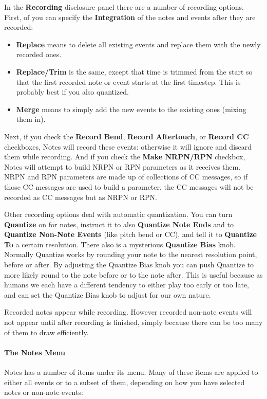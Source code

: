 \documentclass[twoside,10pt]{article}
\begin{document}
In the {\bf Recording} disclosure panel there are a number of recording options.   First, of you can specify the {\bf Integration} of the notes and events after they are recorded:

\begin{itemize}
\item {\bf Replace} means to delete all existing events and replace them with the newly recorded ones.
\item {\bf Replace/Trim} is the same, except that time is trimmed from the start so that the first recorded note or event starts at the first timestep.  This is probably best if you also quantized.
\item {\bf Merge} means to simply add the new events to the existing ones (mixing them in).
\end{itemize}

Next, if you check the {\bf Record Bend}, {\bf Record Aftertouch}, or {\bf Record CC} checkboxes, Notes will record these events: otherwise it will ignore and discard them while recording.   And if you check the {\bf Make NRPN/RPN} checkbox, Notes will attempt to build NRPN or RPN parameters as it receives them.  NRPN and RPN parameters are made up of collections of CC messages, so if those CC messages are used to build a parameter, the CC messages will not be recorded as CC messages but as NRPN or RPN.  

Other recording options deal with automatic quantization.  You can turn {\bf Quantize} on for notes, instruct it to also {\bf Quantize Note Ends} and to {\bf Quantize Non-Note Events} (like pitch bend or CC), and tell it to {\bf Quantize To} a certain resolution.  There also is a mysterious {\bf Quantize Bias} knob.  Normally Quantize works by rounding your note to the nearest resolution point, before or after.  By adjusting the Quantize Bias knob you can push Quantize to more likely round to the note before or to the note after.  This is useful because as humans we each have a different tendency to either play too early or too late, and can set the Quantize Bias knob to adjust for our own nature.

Recorded notes appear while recording.  However recorded non-note events will not appear until after recording is finished, simply because there can be too many of them to draw efficiently.

\paragraph{The Notes Menu} Notes has a number of items under its menu.  Many of these items are applied to either all events or to a subset of them, depending on how you have selected notes or non-note events: 
\end{document}

